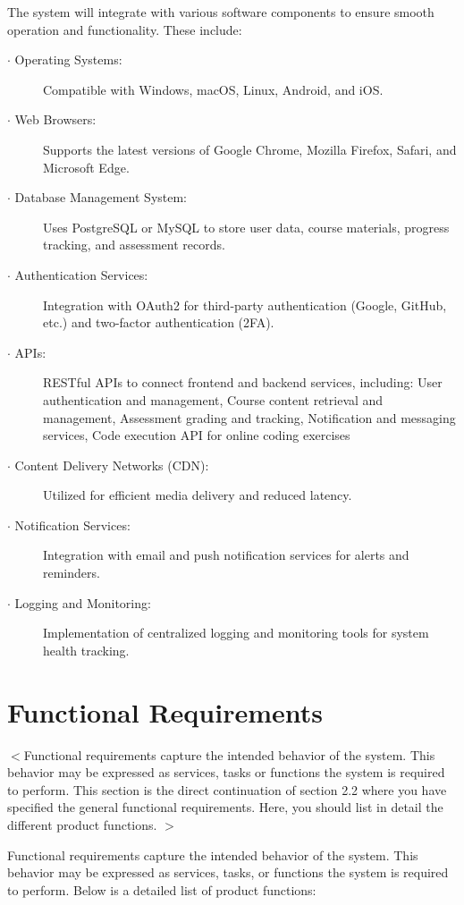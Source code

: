 \documentclass[a4paper, 11pt]{scrreprt}
\begin{document}
The system will integrate with various software components to ensure smooth operation and functionality. These include:
\begin{description}
    \item[$\cdot$ Operating Systems:] Compatible with Windows, macOS, Linux, Android, and iOS.
    \item[$\cdot$ Web Browsers:] Supports the latest versions of Google Chrome, Mozilla Firefox, Safari, and Microsoft Edge.
    \item[$\cdot$ Database Management System:] Uses PostgreSQL or MySQL to store user data, course materials, progress tracking, and assessment records.
    \item[$\cdot$ Authentication Services:] Integration with OAuth2 for third-party authentication (Google, GitHub, etc.) and two-factor authentication (2FA).
    \item[$\cdot$ APIs:] RESTful APIs to connect frontend and backend services, including: User authentication and management, Course content retrieval and management, Assessment grading and tracking, Notification and messaging services, Code execution API for online coding exercises
    \item[$\cdot$ Content Delivery Networks (CDN):] Utilized for efficient media delivery and reduced latency.
    \item[$\cdot$ Notification Services:] Integration with email and push notification services for alerts and reminders.
    \item[$\cdot$ Logging and Monitoring:] Implementation of centralized logging and monitoring tools for system health tracking.
\end{description}


\section{Functional Requirements}
$<$Functional requirements capture the intended behavior of the system. This 
behavior may be expressed as services, tasks or functions the system is required 
to perform. This section is the direct continuation of section 2.2 where you have 
specified the general functional requirements. Here, you should list in detail the
different product functions. $>$

Functional requirements capture the intended behavior of the system. This behavior may be expressed as services, tasks, or functions the system is required to perform. Below is a detailed list of product functions:
\end{document}
